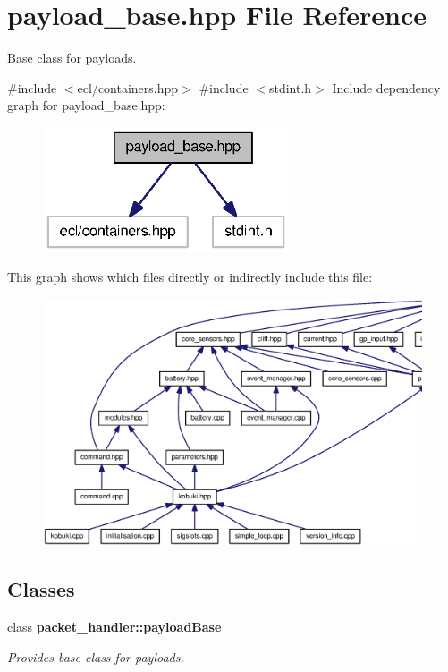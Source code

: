\section{payload\-\_\-base.\-hpp \-File \-Reference}
\label{payload__base_8hpp}


\-Base class for payloads.  


{\ttfamily \#include $<$ecl/containers.\-hpp$>$}\*
{\ttfamily \#include $<$stdint.\-h$>$}\*
\-Include dependency graph for payload\-\_\-base.\-hpp\-:
\nopagebreak
\begin{figure}[H]
\begin{center}
\leavevmode
\includegraphics[width=206pt]{payload__base_8hpp__incl}
\end{center}
\end{figure}
\-This graph shows which files directly or indirectly include this file\-:
\nopagebreak
\begin{figure}[H]
\begin{center}
\leavevmode
\includegraphics[width=350pt]{payload__base_8hpp__dep__incl}
\end{center}
\end{figure}
\subsection*{\-Classes}
\begin{DoxyCompactItemize}
\item 
class {\bf packet\-\_\-handler\-::payload\-Base}
\begin{DoxyCompactList}\small\item\em \-Provides base class for payloads. \end{DoxyCompactList}\end{DoxyCompactItemize}
